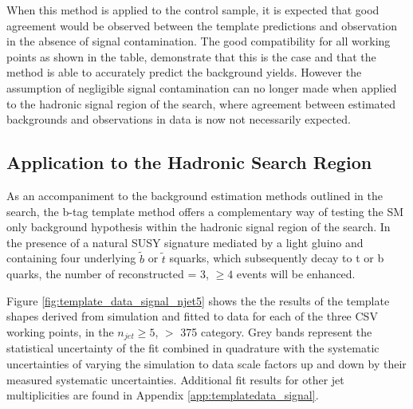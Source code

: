 When this method is applied to the \mupjets control sample, it is expected that good agreement would be observed between the template predictions and observation in the absence of signal contamination. The good compatibility for all working points as shown in the table, demonstrate that this is the case and that the method is able to accurately predict the background yields. However the assumption of negligible signal contamination can no longer made when applied to the hadronic signal region of the \alphat search, where agreement between estimated backgrounds and observations in data is now not necessarily expected.
 
\subsection{Application to the \alphat Hadronic Search Region}
\label{subsec:templatedataresults}

As an accompaniment to the background estimation methods outlined in the \alphat search, the b-tag template method offers a complementary way of testing the \ac{SM} only background hypothesis within the hadronic signal region of the search. In the presence of a natural \ac{SUSY} signature mediated by a light gluino and containing four underlying $\widetilde{b}$ or $\widetilde{t}$ squarks, which subsequently decay to t or b quarks, the number of reconstructed \nbreco = 3, $\geq 4$ events will be enhanced.

Figure \ref{fig:template_data_signal_njet5} shows the  the results of the template shapes derived from simulation and fitted to data for each of the three \ac{CSV} working points, in the $n_{jet} \geq 5$, \theht $>$ 375 \GeV category.  Grey bands represent the statistical uncertainty of the fit combined in quadrature with the systematic uncertainties of varying the simulation to data scale factors up and down by their measured systematic uncertainties.  Additional fit results for other jet multiplicities are found in Appendix \ref{app:templatedata_signal}.

\vspace*{100px}

